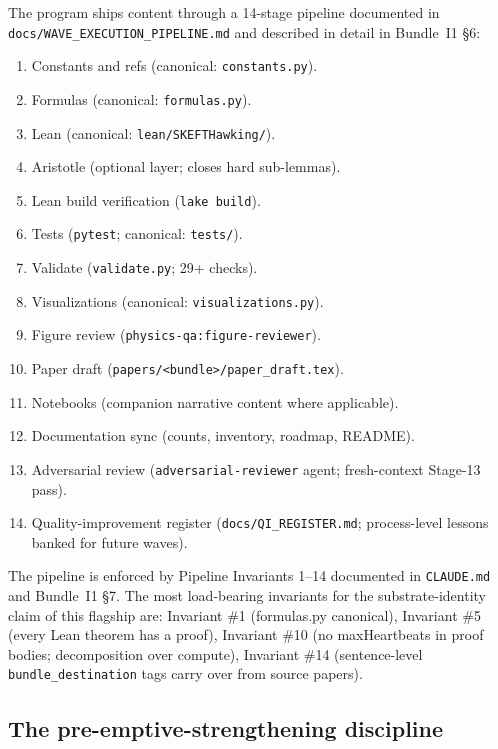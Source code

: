\documentclass[aps,prd,reprint,nofootinbib,superscriptaddress]{revtex4-2}
\begin{document}
The program ships content through a 14-stage pipeline documented in
\texttt{docs/WAVE\_EXECUTION\_PIPELINE.md} and described in detail
in Bundle~I1 \S 6:

\begin{enumerate}\setlength{\itemsep}{0pt}
\item Constants and refs (canonical: \texttt{constants.py}).
\item Formulas (canonical: \texttt{formulas.py}).
\item Lean (canonical: \texttt{lean/SKEFTHawking/}).
\item Aristotle (optional layer; closes hard sub-lemmas).
\item Lean build verification (\texttt{lake build}).
\item Tests (\texttt{pytest}; canonical: \texttt{tests/}).
\item Validate (\texttt{validate.py}; 29+ checks).
\item Visualizations (canonical: \texttt{visualizations.py}).
\item Figure review (\texttt{physics-qa:figure-reviewer}).
\item Paper draft (\texttt{papers/<bundle>/paper\_draft.tex}).
\item Notebooks (companion narrative content where applicable).
\item Documentation sync (counts, inventory, roadmap, README).
\item Adversarial review (\texttt{adversarial-reviewer} agent;
  fresh-context Stage-13 pass).
\item Quality-improvement register (\texttt{docs/QI\_REGISTER.md};
  process-level lessons banked for future waves).
\end{enumerate}

The pipeline is enforced by Pipeline Invariants 1--14 documented in
\texttt{CLAUDE.md} and Bundle~I1 \S 7. The most load-bearing
invariants for the substrate-identity claim of this flagship are:
Invariant \#1 (formulas.py canonical), Invariant \#5 (every Lean
theorem has a proof), Invariant \#10 (no maxHeartbeats in proof
bodies; decomposition over compute), Invariant \#14 (sentence-level
\texttt{bundle\_destination} tags carry over from source papers).

\subsection{The pre-emptive-strengthening discipline}
\end{document}
